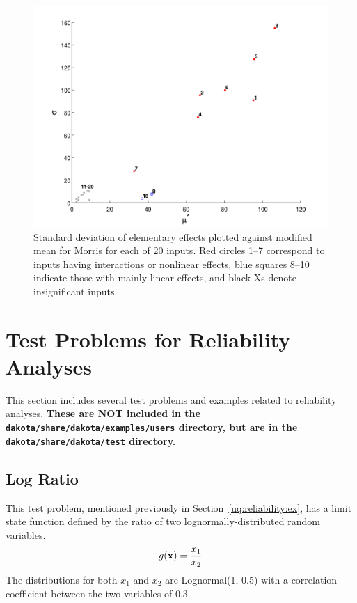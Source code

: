 \begin{figure}[ht!]
\centering
\includegraphics[width=\textwidth]{images/moat_mustar_sigma}
\caption{\label{FIG:mustar_sigma} Standard deviation of elementary
effects plotted against modified mean for Morris for each of 20
inputs. Red circles 1--7 correspond to inputs having interactions or
nonlinear effects, blue squares 8--10 indicate those with mainly
linear effects, and black Xs denote insignificant inputs.}
\end{figure}

\clearpage
\section{Test Problems for Reliability Analyses}\label{additional:reliabilityproblems}
This section includes several test problems and examples related to
reliability analyses. {\bf These are NOT included in the {\tt dakota/share/dakota/examples/users}
directory, but are in the {\tt dakota/share/dakota/test} directory.}


\subsection{Log Ratio}\label{additional:logratio}

This test problem, mentioned previously in
Section~\ref{uq:reliability:ex}, has a limit state function defined by
the ratio of two lognormally-distributed random variables.
\begin{equation}
g({\bf x}) = \frac{x_1}{x_2}
\end{equation}
The distributions for both $x_1$ and $x_2$ are Lognormal(1, 0.5) with
a correlation coefficient between the two variables of 0.3.

